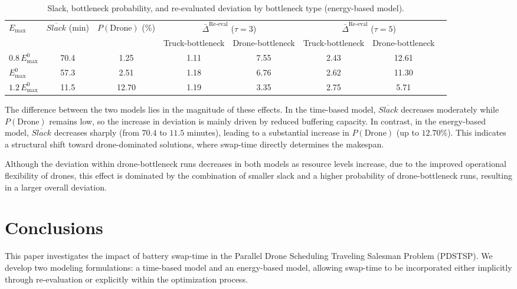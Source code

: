 \documentclass[3p, authoryear, 11pt]{elsarticle}
\begin{document}
\begin{table}[H]
\centering
\caption{Slack, bottleneck probability, and re-evaluated deviation by bottleneck type (energy-based model).}
\label{tab:mechanism_energy}
\scriptsize
\begin{tabular}{lccccccc}
\toprule
$E_{\max}$ 
& $\overline{Slack}$ (min) 
& $P(\text{Drone})$ (\%) 
& \multicolumn{2}{c}{$\bar{\Delta}^{\mathrm{Re\text{-}eval}}$ ($\tau=3$)} 
& \multicolumn{2}{c}{$\bar{\Delta}^{\mathrm{Re\text{-}eval}}$ ($\tau=5$)} \\
\cmidrule(lr){4-5} \cmidrule(lr){6-7}
 &  &  & Truck-bottleneck & Drone-bottleneck 
 & Truck-bottleneck & Drone-bottleneck \\
\midrule
$0.8\,E_{\max}^{0}$ & 70.4 & 1.25 & 1.11 & 7.55 & 2.43 & 12.61 \\
$E_{\max}^{0}$      & 57.3 & 2.51 & 1.18 & 6.76 & 2.62 & 11.30 \\
$1.2\,E_{\max}^{0}$ & 11.5 & 12.70 & 1.19 & 3.35 & 2.75 & 5.71 \\
\bottomrule
\end{tabular}
\end{table}


The difference between the two models lies in the magnitude of these effects. 
In the time-based model, $\overline{Slack}$ decreases moderately while $P(\text{Drone})$ remains low, so the increase in deviation is mainly driven by reduced buffering capacity. 
In contrast, in the energy-based model, $\overline{Slack}$ decreases sharply (from $70.4$ to $11.5$ minutes), leading to a substantial increase in $P(\text{Drone})$ (up to $12.70\%$). This indicates a structural shift toward drone-dominated solutions, where swap-time directly determines the makespan. 

Although the deviation within drone-bottleneck runs decreases in both models as resource levels increase, due to the improved operational flexibility of drones, this effect is dominated by the combination of smaller slack and a higher probability of drone-bottleneck runs, resulting in a larger overall deviation.


\section{Conclusions}
\label{sec:conclusions}

This paper investigates the impact of battery swap-time in the Parallel Drone Scheduling Traveling Salesman Problem (PDSTSP).
We develop two modeling formulations: a time-based model and an energy-based model,
allowing swap-time to be incorporated either implicitly through re-evaluation
or explicitly within the optimization process.
\end{document}
